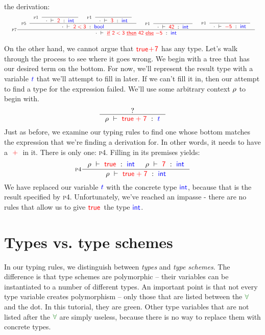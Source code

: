 \documentclass[a4paper]{article}
\newcommand{\RULE}[1]{\textsc{#1}}
\newcommand{\kwd}[1]{\ensuremath{\mathsf{\textcolor{term}{\underline{#1}}}}}
\newcommand{\expr}[1]{\ensuremath{\textcolor{term}{#1}}}
\newcommand{\type}[1]{\ensuremath{\textcolor{blue}{#1}}}
\newcommand{\context}[1]{\ensuremath{\textcolor{black}{#1}}}
\newcommand{\scheme}[1]{\ensuremath{\textcolor{ForestGreen}{#1}}}
\newcommand{\const}[1]{\mathsf{#1}}
\newcommand{\typing}[3]{\ensuremath{#1\ \vdash\ #2\ :\ #3}}
\newcommand{\TRUE}{\ensuremath{\expr{\const{true}}}}
\newcommand{\PLUS}[2]{#1\;\expr{+}\;#2}
\newcommand{\LT}[2]{#1\;\expr{<}\;#2}
\newcommand{\NUM}[1]{\expr{\const{#1}}}
\newcommand{\IF}[3]{\kwd{if}\ #1\ \kwd{then}\ #2\ \kwd{else}\ #3}
\newcommand\INT{\type{\const{int}}}
\newcommand\BOOL{\type{\const{bool}}}
\newcommand{\EMPTY}{\context{\cdot}}
\newcommand{\RHO}{\context{\rho}}
\begin{document}
the derivation:\\
\begin{displaymath}
\resizebox{1.0\textwidth}{!}{
  \inference[\RULE{p7}]{
    \inference[\RULE{p5}]{
      \inference[\RULE{p1}]{}{
        \typing{\EMPTY}{\NUM{2}}{\INT}
      } &
      \inference[\RULE{p1}]{}{
        \typing{\EMPTY}{\NUM{3}}{\INT}
      }
    }{\typing{\EMPTY}{\LT{\NUM{2}}{\NUM{3}}}{\BOOL}} &
    \inference[\RULE{p1}]{}{\typing{\EMPTY}{\NUM{42}}{\INT}} &
    \inference[\RULE{p1}]{}{\typing{\EMPTY}{\NUM{-5}}{\INT}}
  }{
    \typing{\EMPTY}{
      \IF{\LT{\NUM{2}}{\NUM{3}}}{\NUM{42}}{\NUM{-5}}
    }{
      \INT
    }
  }
}
\end{displaymath}

On the other hand, we cannot argue that \PLUS{\TRUE}{\NUM{7}} has any
type. Let's walk through the process to see where it goes wrong. We begin with
a tree that has our desired term on the bottom. For now, we'll represent the
result type with a variable $\type{t}$ that we'll attempt to fill in later. If
we can't fill it in, then our attempt to find a type for the expression
failed. We'll use some arbitrary context $\RHO$ to begin with.
\begin{displaymath}
  \inference{?}{
    \typing{\RHO}{\PLUS{\TRUE}{\NUM{7}}}{\type{t}}
  }
\end{displaymath}
Just as before, we examine our typing rules to find one whose bottom matches
the expression that we're finding a derivation for.  In other words, it needs
to have a $\PLUS{}{}$ in it. There is only one: \RULE{p4}. Filling in its
premises yields:
\begin{displaymath}
  \inference[\RULE{p4}]{
    \typing{\RHO}{\TRUE}{\INT} &
    \typing{\RHO}{\NUM{7}}{\INT}
  }{
    \typing{\RHO}{\PLUS{\TRUE}{\NUM{7}}}{\INT}
  }
\end{displaymath}
We have replaced our variable $\type{t}$ with the concrete type \INT, because
that is the result specified by \RULE{p4}. Unfortunately, we've reached an
impasse - there are no rules that allow us to give \TRUE\ the type \INT.

\section{Types vs. type schemes}
\label{sec:types-vs.-type}

In our typing rules, we distinguish between \emph{types} and \emph{type
  schemes}. The difference is that type schemes are polymorphic -- their
variables can be instantiated to a number of different types. An important
point is that not every type variable creates polymorphism -- only those that
are listed between the $\scheme{\forall}$ and the dot. In this tutorial, they
are green.  Other type variables that are not listed after the
$\scheme{\forall}$ are simply useless, because there is no way to replace
them with concrete types.
\end{document}
